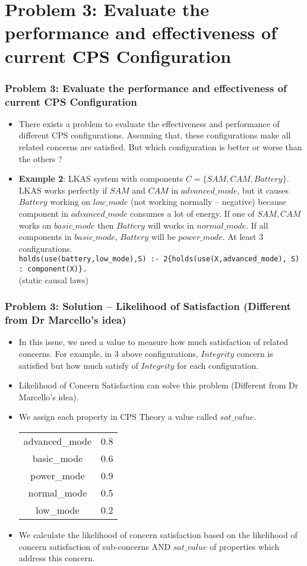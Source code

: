 \documentclass{beamer}
\begin{document}
\section{Problem 3: Evaluate the performance and effectiveness of current CPS Configuration} 
\begin{frame}[fragile]
	\frametitle{Problem 3: Evaluate the performance and effectiveness of current CPS Configuration}
	\begin{itemize}
		\item There exists a problem to evaluate the effectiveness and performance of different CPS configurations. Assuming that, these configurations make all related concerns are satisfied. But which configuration is better or worse than the others ?  
		\item {\bf Example 2}: LKAS system with components $C = \{SAM,CAM,Battery\}$. LKAS works perfectly if $SAM$ and $CAM$ in $advanced\_mode$, but it causes $Battery$ working on $low\_mode$ (not working normally -- negative) because component in $advanced\_mode$ consumes a lot of energy. If one of $SAM,CAM$ works on $basic\_mode$ then $Battery$ will works in $normal\_mode$. If all components in $basic\_mode$, $Battery$ will be $power\_mode$. At least 3 configurations. \\	
		{\tt holds(use(battery,low\_mode),S) :- 2\{holds(use(X,advanced\_mode), S) : component(X)\}.} \\
		(static causal laws)
	\end{itemize}
\end{frame}

\begin{frame}[fragile]
	\frametitle{Problem 3: Solution -- Likelihood of Satisfaction (Different from Dr Marcello's idea)}
	\begin{itemize}
		\item In this issue, we need a value to measure how much satisfaction of related concerns. For example, in 3 above configurations, $Integrity$ concern is satisfied but how much satisfy of $Integrity$ for each configuration.
		\item Likelihood of Concern Satisfaction can solve this problem (Different from Dr Marcello's idea).
		\item We assign each property in CPS Theory a value called $sat\_value$.
		\begin{center}
			\begin{tabular}{ |c|c| } 
				\hline
				advanced\_mode & 0.8  \\ 
				basic\_mode & 0.6  \\
				\hline
				power\_mode & 0.9  \\ 
				normal\_mode & 0.5  \\
				low\_mode & 0.2  \\
				\hline
			\end{tabular}
		\end{center}
		\item We calculate the likelihood of concern satisfaction based on the likelihood of concern satisfaction of sub-concerns AND $sat\_value$ of properties which address this concern.	
	\end{itemize}
\end{frame}
\end{document}
